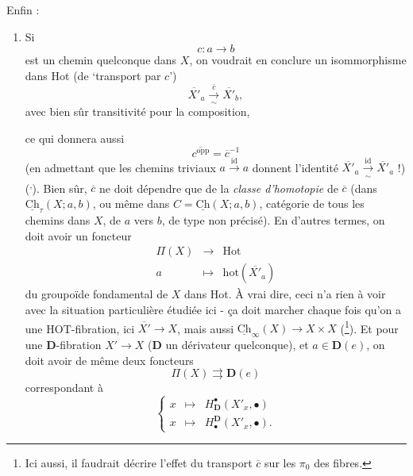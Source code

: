 \documentclass[11pt]{article}
\newcommand{\printedpage}[1]{\marginpar{\footnotesize p.~#1}}
\newcommand{\msp}[1]{\marginpar{\footnotesize [#1]}}
\newcommand{\uCh}{\underline{\mathrm{Ch}}}
\newcommand{\hot}{\mathrm{hot}}
\begin{document}
Enfin :

\begin{enumerate}[label={}, leftmargin=*]
\item[4$^o$)] Si
\[
c:a\longrightarrow b
\]
est un chemin quelconque dans $X$, on voudrait en conclure un isommorphisme dans Hot (de `transport par $c$') %
\[
\overline{X'}_a\xrightarrow[\sim]{\bar{c}}\overline{X'}_b,
\]
avec bien sûr transitivité pour la composition,

\msp{page 141}

ce qui donnera aussi
\[
\overline{c^{\mathrm{opp}}}=\overline{c}^{-1}
\]
(en admettant que les chemins triviaux $a\xrightarrow{\mathrm{id}}a$ donnent l'identité $\overline{X'}_a\xrightarrow[\sim]{\mathrm{id}}\overline{X'}_a$ !) (\footnotemark[32]\textsuperscript{,}\footnotemark[33]). Bien sûr, $\overline{c}$ ne doit dépendre que de la \textit{classe d'homotopie} de $\overline{c}$ (dans %
\printedpage{88}
$\uCh_\tau(X;a,b)$, ou même dans $C=\uCh(X;a,b)$, catégorie de tous les chemins dans $X$, de $a$ vers $b$, de type non précisé). En d'autres termes, on doit avoir un foncteur
\[
\begin{array}{rcl}
\Pi(X) & \longrightarrow & \mathrm{Hot}\\[4pt]
a & \longmapsto & \hot(\overline{X'}_a)
\end{array}
\]
du groupoïde fondamental de $X$ dans Hot. À vrai dire, ceci n'a rien à voir avec la situation particulière étudiée ici - ça doit marcher chaque fois qu'on a une HOT-fibration, ici $\overline{X'}\longrightarrow X$, mais aussi $\uCh_\infty(X)\longrightarrow X\times X$ (\footnote[34]{Ici aussi, il faudrait décrire l'effet du transport $\overline{c}$ sur les $\pi_0$ des fibres.}). Et pour une $\mathbf{D}$-fibration $X'\longrightarrow X$ ($\mathbf{D}$ un dérivateur quelconque), et $a\in\mathbf{D}(e)$, on doit avoir de même deux foncteurs
\[
\Pi(X)\rightrightarrows\mathbf{D}(e)
\]
correspondant à
\[
\left\{\begin{array}{lcl}
x & \longmapsto & H^\bullet_{\mathbf{D}}(X'_x,\bullet)\\[4pt]
x & \longmapsto & H_\bullet^{\mathbf{D}}(X'_x,\bullet).
\end{array}\right.
\]

\msp{page 142}


\end{enumerate}
\end{document}
